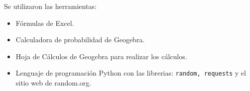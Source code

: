 Se utilizaron las herramientas: 
\begin{itemize}
    \item Fórmulas de Excel.
    \item Calculadora de probabilidad de Geogebra.
    \item Hoja de Cálculos de Geogebra para realizar los cálculos.
    \item Lenguaje de programación Python con las librerias: \verb|random, requests| y el sitio web de random.org.
\end{itemize}

